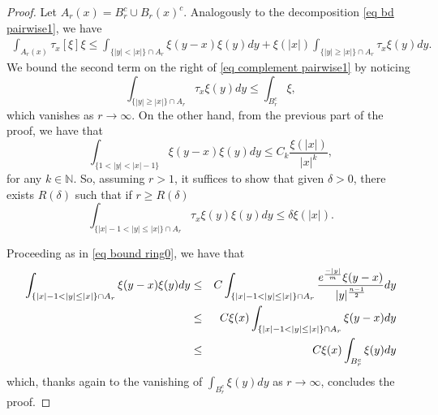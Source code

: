 \documentclass[11pt,letterpaper,reqno]{amsart}
\newcommand{\N}{\mathbb{N}}
\theoremstyle{plain}%
\theoremstyle{definition}
\numberwithin{equation}{section}
\numberwithin{figure}{section}
\begin{document}
\begin{proof}
Let $A_r(x)=B_r^c \cup B_r(x)^c$. Analogously to the decomposition \eqref{eq bd pairwise1}, we have
	\begin{eqnarray}\label{eq complement pairwise1}
\int_{A_r(x) } \tau_{x}[\xi] \xi \leq  \int_{\{|y| < |x|\}\cap A_r} \xi(y-x) \xi(y)dy+\xi(|x|)\int_{\{|y| \geq |x|\}\cap A_r} \tau_{x}\xi(y)dy.
\end{eqnarray}
We bound the second term on the right of \eqref{eq complement pairwise1} by noticing
\begin{equation}\label{eq bound st}
	\int_{\{|y| \geq |x|\}\cap A_r} \tau_{x}\xi(y)dy\leq \int_{B_r^c} \xi,
\end{equation}
which vanishes as $r\to \infty$. On the other hand, from the previous part of the proof, we have that
\begin{equation}\label{eq fast decay}
	\int_{\{1<|y| < |x|-1\}} \xi(y-x) \xi(y)dy \leq C_k\frac{\xi(|x|)}{|x|^k},
\end{equation}
for any $k\in \N$. So, assuming $r>1$, it suffices to show that given $\delta>0$, there exists $R(\delta)$ such that if $r\geq R(\delta)$
\begin{equation}\label{eq ring bound}
	\int_{\{|x|-1< |y| \leq |x|\}\cap A_r} \tau_{x}\xi(y)\xi(y)dy\leq \delta \xi(|x|).
\end{equation}

Proceeding as in \eqref{eq bound ring0}, we have that
	\begin{eqnarray*}\notag
	\int_{\{|x|-1< |y| \leq |x|\}\cap A_r} \xi(y-x) \xi(y)dy &\leq& 	C\int_{\{|x|-1< |y| \leq |x|\}\cap A_r} \frac{e^{\frac{-|y|}{m}}\xi(y-x)}{|y|^\frac{n-1}{2}}dy\\\notag
	&\leq& 	C \xi(x)\int_{\{|x|-1< |y| \leq |x|\}\cap A_r} \xi(y-x)dy\\
	&\leq& 	C \xi(x)\int_{B_r^c} \xi(y)dy
\end{eqnarray*}
which, thanks again to the vanishing of $\int_{B_r^c} \xi(y)dy$ as $r\to \infty$, concludes the proof.
\end{proof}
\end{document}
